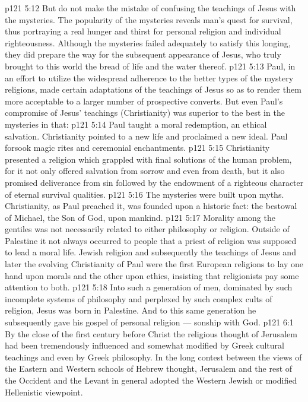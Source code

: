 \vs p121 5:12 \pc But do not make the mistake of confusing the teachings of Jesus with the mysteries. The popularity of the mysteries reveals man’s quest for survival, thus portraying a real hunger and thirst for personal religion and individual righteousness. Although the mysteries failed adequately to satisfy this longing, they did prepare the way for the subsequent appearance of Jesus, who truly brought to this world the bread of life and the water thereof.
\vs p121 5:13 Paul, in an effort to utilize the widespread adherence to the better types of the mystery religions, made certain adaptations of the teachings of Jesus so as to render them more acceptable to a larger number of prospective converts. But even Paul’s compromise of Jesus’ teachings (Christianity) was superior to the best in the mysteries in that:
\vs p121 5:14 \bibnobreakspace Paul taught a moral redemption, an ethical salvation. Christianity pointed to a new life and proclaimed a new ideal. Paul forsook magic rites and ceremonial enchantments.
\vs p121 5:15 \bibnobreakspace Christianity presented a religion which grappled with final solutions of the human problem, for it not only offered salvation from sorrow and even from death, but it also promised deliverance from sin followed by the endowment of a righteous character of eternal survival qualities.
\vs p121 5:16 \bibnobreakspace The mysteries were built upon myths. Christianity, as Paul preached it, was founded upon a historic fact: the bestowal of Michael, the Son of God, upon mankind.
\vs p121 5:17 \pc Morality among the gentiles was not necessarily related to either philosophy or religion. Outside of Palestine it not always occurred to people that a priest of religion was supposed to lead a moral life. Jewish religion and subsequently the teachings of Jesus and later the evolving Christianity of Paul were the first European religions to lay one hand upon morals and the other upon ethics, insisting that religionists pay some attention to both.
\vs p121 5:18 Into such a generation of men, dominated by such incomplete systems of philosophy and perplexed by such complex cults of religion, Jesus was born in Palestine. And to this same generation he subsequently gave his gospel of personal religion --- sonship with God.
\vs p121 6:1 By the close of the first century before Christ the religious thought of Jerusalem had been tremendously influenced and somewhat modified by Greek cultural teachings and even by Greek philosophy. In the long contest between the views of the Eastern and Western schools of Hebrew thought, Jerusalem and the rest of the Occident and the Levant in general adopted the Western Jewish or modified Hellenistic viewpoint.
